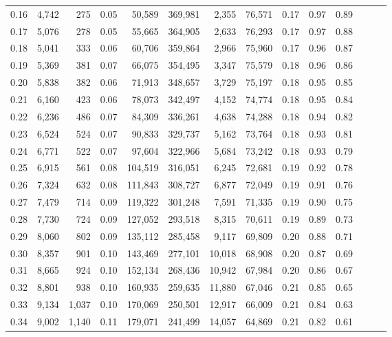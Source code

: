 \begin{tabular}{rrrrrrrrrrrrrr}
0.16 &  4,742 &    275 &  0.05 &   50,589 &  369,981 &   2,355 &  76,571 &  0.17 &  0.97 &      0.89 \\
0.17 &  5,076 &    278 &  0.05 &   55,665 &  364,905 &   2,633 &  76,293 &  0.17 &  0.97 &      0.88 \\
0.18 &  5,041 &    333 &  0.06 &   60,706 &  359,864 &   2,966 &  75,960 &  0.17 &  0.96 &      0.87 \\
0.19 &  5,369 &    381 &  0.07 &   66,075 &  354,495 &   3,347 &  75,579 &  0.18 &  0.96 &      0.86 \\
0.20 &  5,838 &    382 &  0.06 &   71,913 &  348,657 &   3,729 &  75,197 &  0.18 &  0.95 &      0.85 \\
0.21 &  6,160 &    423 &  0.06 &   78,073 &  342,497 &   4,152 &  74,774 &  0.18 &  0.95 &      0.84 \\
0.22 &  6,236 &    486 &  0.07 &   84,309 &  336,261 &   4,638 &  74,288 &  0.18 &  0.94 &      0.82 \\
0.23 &  6,524 &    524 &  0.07 &   90,833 &  329,737 &   5,162 &  73,764 &  0.18 &  0.93 &      0.81 \\
0.24 &  6,771 &    522 &  0.07 &   97,604 &  322,966 &   5,684 &  73,242 &  0.18 &  0.93 &      0.79 \\
0.25 &  6,915 &    561 &  0.08 &  104,519 &  316,051 &   6,245 &  72,681 &  0.19 &  0.92 &      0.78 \\
0.26 &  7,324 &    632 &  0.08 &  111,843 &  308,727 &   6,877 &  72,049 &  0.19 &  0.91 &      0.76 \\
0.27 &  7,479 &    714 &  0.09 &  119,322 &  301,248 &   7,591 &  71,335 &  0.19 &  0.90 &      0.75 \\
0.28 &  7,730 &    724 &  0.09 &  127,052 &  293,518 &   8,315 &  70,611 &  0.19 &  0.89 &      0.73 \\
0.29 &  8,060 &    802 &  0.09 &  135,112 &  285,458 &   9,117 &  69,809 &  0.20 &  0.88 &      0.71 \\
0.30 &  8,357 &    901 &  0.10 &  143,469 &  277,101 &  10,018 &  68,908 &  0.20 &  0.87 &      0.69 \\
0.31 &  8,665 &    924 &  0.10 &  152,134 &  268,436 &  10,942 &  67,984 &  0.20 &  0.86 &      0.67 \\
0.32 &  8,801 &    938 &  0.10 &  160,935 &  259,635 &  11,880 &  67,046 &  0.21 &  0.85 &      0.65 \\
0.33 &  9,134 &  1,037 &  0.10 &  170,069 &  250,501 &  12,917 &  66,009 &  0.21 &  0.84 &      0.63 \\
0.34 &  9,002 &  1,140 &  0.11 &  179,071 &  241,499 &  14,057 &  64,869 &  0.21 &  0.82 &      0.61 \\

\end{tabular}

